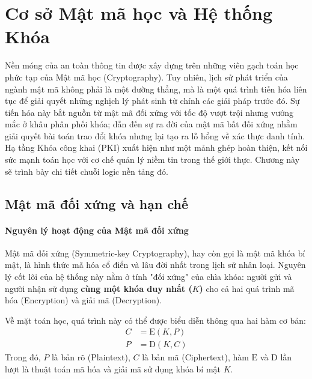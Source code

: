 \chapter{Cơ sở Mật mã học và Hệ thống Khóa}
\label{chap:crypto}

Nền móng của an toàn thông tin được xây dựng trên những viên gạch toán học phức tạp của Mật mã học (Cryptography).
Tuy nhiên, lịch sử phát triển của ngành mật mã không phải là một đường thẳng, mà là một quá trình tiến hóa liên tục để giải quyết những nghịch lý phát sinh từ chính các giải pháp trước đó. Sự tiến hóa này bắt nguồn từ mật mã đối xứng với tốc độ vượt trội nhưng vướng mắc ở khâu phân phối khóa; dẫn đến sự ra đời của mật mã bất đối xứng nhằm giải quyết bài toán trao đổi khóa nhưng lại tạo ra lỗ hổng về xác thực danh tính.
Hạ tầng Khóa công khai (PKI) xuất hiện như một mảnh ghép hoàn thiện, kết nối sức mạnh toán học với cơ chế quản lý niềm tin trong thế giới thực. Chương này sẽ trình bày chi tiết chuỗi logic nền tảng đó.

\section{Mật mã đối xứng và hạn chế}
\label{sec:2.1}

\subsubsection*{Nguyên lý hoạt động của Mật mã đối xứng}

Mật mã đối xứng (Symmetric-key Cryptography), hay còn gọi là mật mã khóa bí mật, là hình thức mã hóa cổ điển và lâu đời nhất trong lịch sử nhân loại. Nguyên lý cốt lõi của hệ thống này nằm ở tính "đối xứng" của chìa khóa: người gửi và người nhận sử dụng \textbf{cùng một khóa duy nhất ($K$)} cho cả hai quá trình mã hóa (Encryption) và giải mã (Decryption).

Về mặt toán học, quá trình này có thể được biểu diễn thông qua hai hàm cơ bản:
\begin{align*}
    C &= \mathrm{E}(K, P) \\
    P &= \mathrm{D}(K, C)
\end{align*}
Trong đó, $P$ là bản rõ (Plaintext), $C$ là bản mã (Ciphertext), hàm $\mathrm{E}$ và $\mathrm{D}$ lần lượt là thuật toán mã hóa và giải mã sử dụng khóa bí mật $K$.

